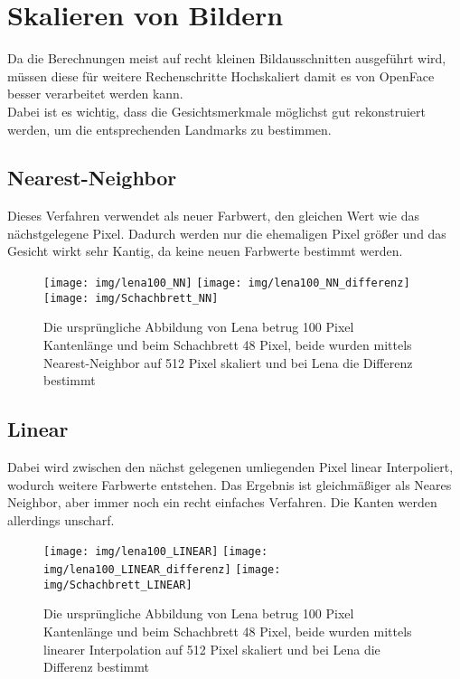 \section{Skalieren von Bildern}
\label{scale_Algos}
Da die Berechnungen meist auf recht kleinen Bildausschnitten ausgeführt wird, müssen diese für weitere Rechenschritte Hochskaliert damit es von OpenFace besser verarbeitet werden kann.\\
Dabei ist es wichtig, dass die Gesichtsmerkmale möglichst gut rekonstruiert werden, um die entsprechenden Landmarks zu bestimmen.
\subsection{Nearest-Neighbor}
Dieses Verfahren verwendet als neuer Farbwert, den gleichen Wert wie das nächstgelegene Pixel. Dadurch werden nur die ehemaligen Pixel größer und das Gesicht wirkt sehr Kantig, da keine neuen Farbwerte bestimmt werden.
\begin{figure}
	\centering
	\texttt{[image: img/lena100\_NN]}
	\texttt{[image: img/lena100\_NN\_differenz]}
	\texttt{[image: img/Schachbrett\_NN]}
	\caption{Die ursprüngliche Abbildung von Lena betrug 100 Pixel Kantenlänge und beim Schachbrett 48 Pixel, beide wurden mittels Nearest-Neighbor auf 512 Pixel skaliert und bei Lena die Differenz bestimmt}
	\label{img_NN}
\end{figure}
\subsection{Linear}
Dabei wird zwischen den nächst gelegenen umliegenden Pixel linear Interpoliert, wodurch weitere Farbwerte entstehen. Das Ergebnis ist gleichmäßiger als Neares Neighbor, aber immer noch ein recht einfaches Verfahren. Die Kanten werden allerdings unscharf.
\begin{figure}
	\centering
	\texttt{[image: img/lena100\_LINEAR]}
	\texttt{[image: img/lena100\_LINEAR\_differenz]}
	\texttt{[image: img/Schachbrett\_LINEAR]}
	\caption{Die ursprüngliche Abbildung von Lena betrug 100 Pixel Kantenlänge und beim Schachbrett 48 Pixel, beide wurden mittels linearer Interpolation auf 512 Pixel skaliert und bei Lena die Differenz bestimmt}
	\label{img_Linear}
\end{figure}
